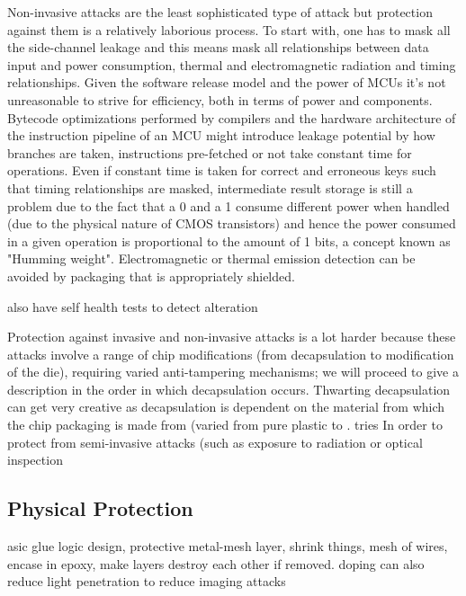 Non-invasive attacks are the least sophisticated type of attack but protection against them is a relatively laborious process\citep{anderson:cautionary_note}. To start with, one has to mask all the side-channel leakage and this means mask all relationships between data input and power consumption, thermal and electromagnetic radiation and timing relationships\citep{kocher:DPA}\cite{sergei:thesis}. Given the software release model and the power of MCUs it's not unreasonable to strive for efficiency, both in terms of power and components. Bytecode optimizations performed by compilers and the hardware architecture of the instruction pipeline of an MCU might introduce leakage potential \citep{kocher:DPA}\citep{sergei:thesis} by how branches are taken, instructions pre-fetched or not take constant time for operations. Even if constant time is taken for correct and erroneous keys such that timing relationships are masked, intermediate result storage is still a problem due to the fact that a 0 and a 1 consume different power when handled (due to the physical nature of CMOS transistors) and hence the power consumed in a given operation is proportional to the amount of 1 bits, a concept known as "Humming weight"\citep{website:riscure}\citep{kocher:DPA}. Electromagnetic or thermal emission detection can be avoided by packaging that is appropriately shielded. 

also have self health tests to detect alteration\citep{anderson:tamper_resistance}

Protection against invasive and non-invasive attacks is a lot harder because these attacks involve a range of chip modifications (from decapsulation to modification of the die), requiring varied anti-tampering mechanisms; we will proceed to give a description in the order in which decapsulation occurs. Thwarting decapsulation can get very creative as decapsulation is dependent on the material from which the chip packaging is made from (varied from pure plastic to . tries In order to protect from semi-invasive attacks (such as exposure to radiation or optical inspection
\subsection{Physical Protection}
asic glue logic design, protective metal-mesh layer, shrink things, mesh of wires, encase in epoxy, make layers destroy each other if removed. doping can also reduce light penetration to reduce imaging attacks 
